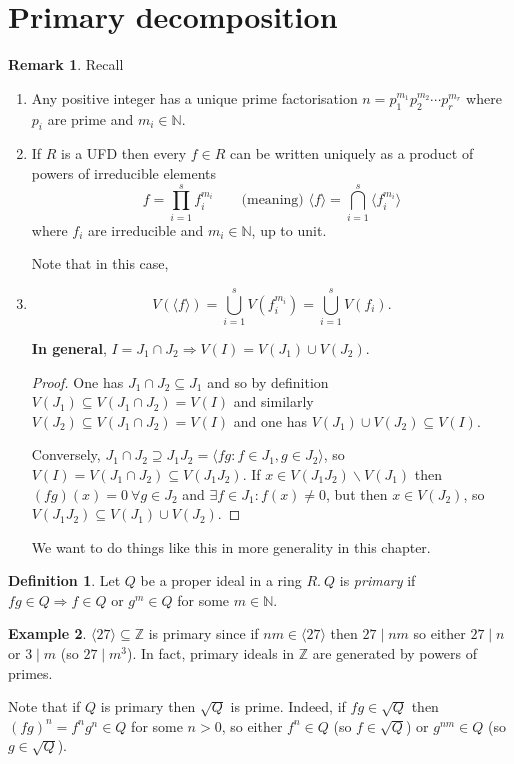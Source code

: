 \documentclass[a4paper]{article}
\newcommand{\la}{\langle}
\newcommand{\ra}{\rangle}
\newcommand{\Z}{\mathbb Z}
\theoremstyle{definition}
\newtheorem{defn}{Definition}[subsection]
\newtheorem{example}[defn]{Example}
\newtheorem*{remark}{Remark}
\begin{document}
\section{Primary decomposition}
\begin{remark}
Recall
\begin{enumerate}
\item Any positive integer has a unique prime factorisation $n=p_1^{m_1}p_2^{m_2}\cdots p_r^{m_r}$ where $p_i$ are prime and $m_i\in\mathbb N$.
\item If $R$ is a UFD then every $f\in R$ can be written uniquely as a product of powers of irreducible elements
\[
f=\prod_{i=1}^s f_i^{m_i}\qquad \text{(meaning) } \la f\ra=\bigcap_{i=1}^s \la f_i^{m_i}\ra
\]
where $f_i$ are irreducible and $m_i\in\mathbb N$, up to unit.

Note that in this case,
\item \[
V(\la f\ra)=\bigcup_{i=1}^s V(f_i^{m_i})=\bigcup_{i=1}^s V(f_i).
\]

\textbf{In general}, $I=J_1\cap J_2\Rightarrow V(I)=V(J_1)\cup V(J_2)$.
\begin{proof}
One has $J_1\cap J_2\subseteq J_1$ and so by definition $V(J_1)\subseteq V(J_1\cap J_2)=V(I)$ and similarly $V(J_2)\subseteq V(J_1\cap J_2)=V(I)$ and one has $V(J_1)\cup V(J_2)\subseteq V(I)$.

Conversely, $J_1\cap J_2\supseteq J_1J_2=\la fg:f\in J_1,g\in J_2\ra$, so $V(I)=V(J_1\cap J_2)\subseteq V(J_1J_2)$. If $x\in V(J_1J_2)\backslash V(J_1)$ then $(fg)(x)=0 \ \forall g\in J_2$ and $\exists f\in J_1:f(x)\neq 0$, but then $x\in V(J_2)$, so $V(J_1J_2)\subseteq V(J_1)\cup V(J_2)$.
\end{proof}

We want to do things like this in more generality in this chapter.
\end{enumerate}
\end{remark}

\begin{defn}
Let $Q$ be a proper ideal in a ring $R.\ Q$ is \textit{primary} if $fg\in Q\Rightarrow f\in Q$ or $g^m\in Q$ for some $m\in\mathbb N$.
\end{defn}
\begin{example}
$\la27\ra\subseteq\Z$ is primary since if $nm\in\la27\ra$ then $27\mid nm$ so either $27\mid n$ or $3\mid m$ (so $27\mid m^3$). In fact, primary ideals in $\Z$ are generated by powers of primes.
\end{example}

Note that if $Q$ is primary then $\sqrt Q$ is prime. Indeed, if $fg\in\sqrt Q$ then $(fg)^n=f^ng^n\in Q$ for some $n>0$, so either $f^n\in Q$ (so $f\in\sqrt Q$) or $g^{nm}\in Q$ (so $g\in\sqrt Q$).
\end{document}

